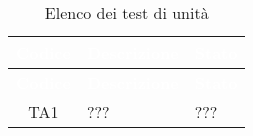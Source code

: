 {
\renewcommand{\arraystretch}{1.5}
\centering
\begin{longtable}{ c C{13cm} C{1cm}}
\caption{Elenco dei test di unità}\\
\textcolor{white}{\textbf{Codice}} & \textcolor{white}{\textbf{Descrizione}} & \textcolor{white}{\textbf{Stato}}\\
\endfirsthead
{}
\textcolor{white}{\textbf{Codice}} & \textcolor{white}{\textbf{Descrizione}} & \textcolor{white}{\textbf{Stato}}\\
\endhead

TA1 & ??? & ??? \\

\end{longtable}
}